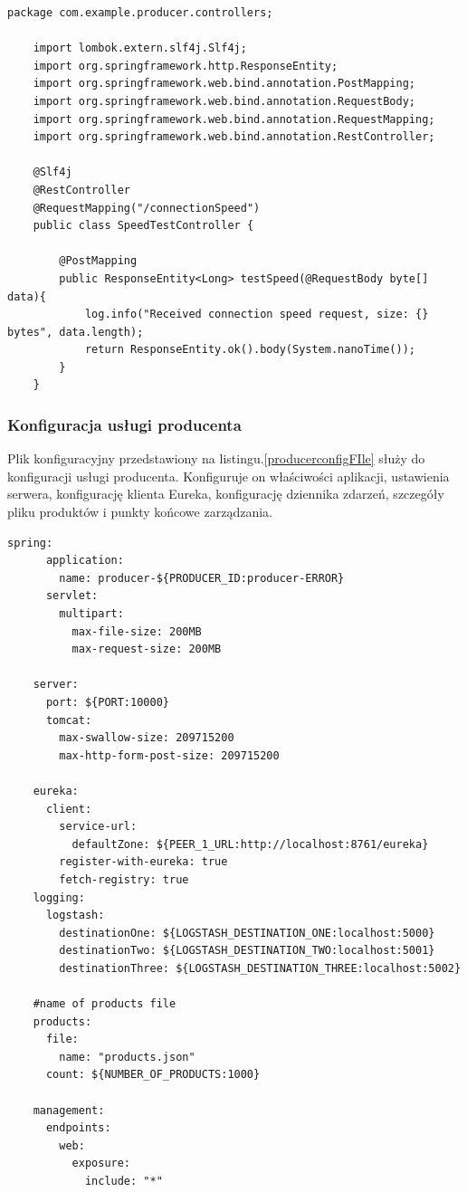 \begin{lstlisting}[caption=Kod klasy SpeedTestController, label=speedTestControllerCode]
    package com.example.producer.controllers;

    import lombok.extern.slf4j.Slf4j;
    import org.springframework.http.ResponseEntity;
    import org.springframework.web.bind.annotation.PostMapping;
    import org.springframework.web.bind.annotation.RequestBody;
    import org.springframework.web.bind.annotation.RequestMapping;
    import org.springframework.web.bind.annotation.RestController;
    
    @Slf4j
    @RestController
    @RequestMapping("/connectionSpeed")
    public class SpeedTestController {
    
        @PostMapping
        public ResponseEntity<Long> testSpeed(@RequestBody byte[] data){
            log.info("Received connection speed request, size: {} bytes", data.length);
            return ResponseEntity.ok().body(System.nanoTime());
        }
    }
\end{lstlisting}

\subsubsection{Konfiguracja usługi producenta}

Plik konfiguracyjny przedstawiony na listingu.\ref{producerconfigFIle} służy do konfiguracji usługi producenta. Konfiguruje on właściwości aplikacji, ustawienia serwera, konfigurację klienta Eureka, konfigurację dziennika zdarzeń, szczegóły pliku produktów i punkty końcowe zarządzania.

\begin{lstlisting}[caption=Plik konfiguracyjny usługi producenta, label=producerconfigFIle]
    spring:
      application:
        name: producer-${PRODUCER_ID:producer-ERROR}
      servlet:
        multipart:
          max-file-size: 200MB
          max-request-size: 200MB
    
    server:
      port: ${PORT:10000}
      tomcat:
        max-swallow-size: 209715200
        max-http-form-post-size: 209715200
    
    eureka:
      client:
        service-url:
          defaultZone: ${PEER_1_URL:http://localhost:8761/eureka}
        register-with-eureka: true
        fetch-registry: true
    logging:
      logstash:
        destinationOne: ${LOGSTASH_DESTINATION_ONE:localhost:5000}
        destinationTwo: ${LOGSTASH_DESTINATION_TWO:localhost:5001}
        destinationThree: ${LOGSTASH_DESTINATION_THREE:localhost:5002}
    
    #name of products file
    products:
      file:
        name: "products.json"
      count: ${NUMBER_OF_PRODUCTS:1000}
    
    management:
      endpoints:
        web:
          exposure:
            include: "*"
\end{lstlisting}

